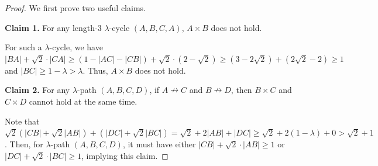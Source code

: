 \documentclass[11pt]{article}
\theoremstyle{remark}
\begin{document}
\begin{proof}


We first prove two useful claims.

 \smallskip\noindent\textbf{Claim 1.} For any length-3 $\lambda$-cycle $(A,B,C,A)$, $A\times B$ does not hold. %

 For such a $\lambda$-cycle, we have $|BA|+\sqrt2\cdot |CA|\ge (1-|AC|-|CB|) + \sqrt2\cdot (2-\sqrt2) \ge (3-2\sqrt2) + (2\sqrt2-2) \ge 1$ and $|BC|\ge 1-\lambda >\lambda$. Thus, $A\times B$ does not hold. %


\smallskip\noindent\textbf{Claim 2.} For any $\lambda$-path $(A,B,C,D)$, if $A\nrightarrow C$ and $B\nrightarrow D$, then $B\times C$ and $C\times D$ cannot hold at the same time.

 Note that $\sqrt2(|CB|+\sqrt2|AB|)+(|DC|+\sqrt2|BC|)=\sqrt2+2|AB|+|DC|\ge \sqrt2 + 2(1-\lambda)+0>\sqrt2+1$. Then, for $\lambda$-path $(A,B,C,D)$, it must have either $|CB|+\sqrt2 \cdot |AB|\ge1$ or $|DC|+\sqrt2 \cdot |BC|\ge1$, implying this claim.


\end{proof}
\end{document}
